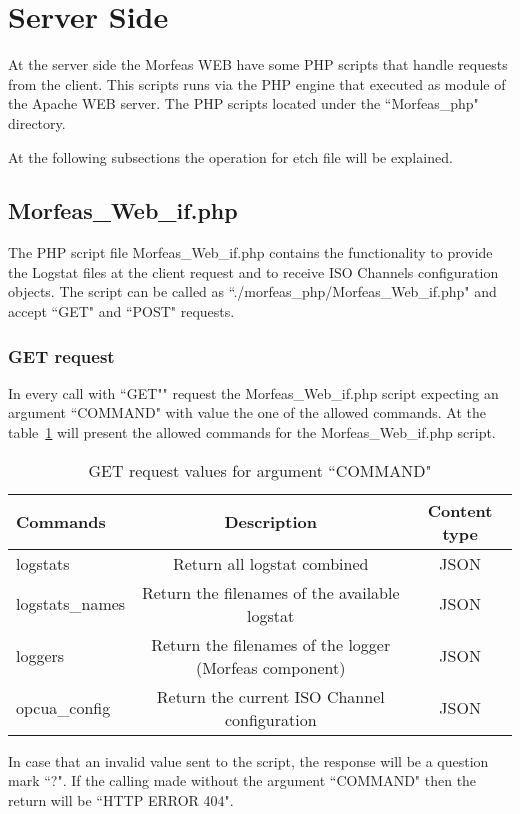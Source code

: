 \section{Server Side}
At the server side the Morfeas WEB have some PHP scripts that handle requests from the client. This scripts runs via the PHP engine that executed as module of the Apache WEB server.
The PHP scripts located under the ``Morfeas\_php" directory.

At the following subsections the operation for etch file will be explained.

\subsection{Morfeas\_Web\_if.php}
The PHP script file Morfeas\_Web\_if.php contains the functionality to provide the Logstat files at the client request and to receive ISO Channels configuration objects.
The script can be called as ``./morfeas\_php/Morfeas\_Web\_if.php" and accept ``GET" and ``POST" requests.
\subsubsection{GET request}
In every call with ``GET"" request the Morfeas\_Web\_if.php script expecting an argument ``COMMAND" with value the one of the allowed commands.
At the table~\ref{table:Morfeas_Web_if} will present the allowed commands for the Morfeas\_Web\_if.php script.

\begin{table}[h]
\centering
\begin{tabular}{|l|c|c|}
 \hline
 \textbf{Commands} & \textbf{Description} & \textbf{Content type}\\
 \hline
 logstats & Return all logstat combined & JSON \\
 logstats\_names & Return the filenames of the available logstat & JSON \\
 loggers & Return the filenames of the logger (Morfeas component)& JSON \\
 opcua\_config & Return the current ISO Channel configuration & JSON\\
 \hline
\end{tabular}
\caption{GET request values for argument ``COMMAND"}
\label{table:Morfeas_Web_if}
\end{table}

In case that an invalid value sent to the script, the response will be a question mark ``?".
If the calling made without the argument ``COMMAND" then the return will be ``HTTP ERROR 404".

